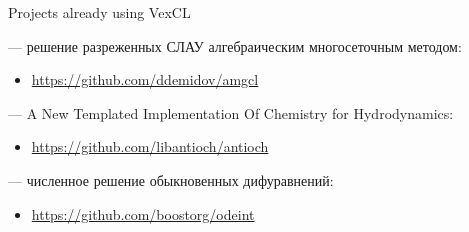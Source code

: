 \documentclass[@BEAMER_OPTIONS@]{beamer}
\begin{document}
\begin{frame}{Projects already using VexCL}
    \begin{description}[\quad]
        \item[AMGCL] --- решение разреженных СЛАУ алгебраическим многосеточным
            методом:
            \begin{itemize}
                \item \href{https://github.com/ddemidov/amgcl}{https://github.com/ddemidov/amgcl}
            \end{itemize}
            \vspace{\baselineskip}
        \item[Antioch] --- A New Templated Implementation Of Chemistry for
            Hydrodynamics:
            \begin{itemize}
                \item \href{https://github.com/libantioch/antioch}{https://github.com/libantioch/antioch}
            \end{itemize}
            \vspace{\baselineskip}
        \item[Boost.odeint] --- численное решение обыкновенных дифуравнений:
            \begin{itemize}
                \item \href{https://github.com/boostorg/odeint}{https://github.com/boostorg/odeint}
            \end{itemize}
    \end{description}
\end{frame}

\note{ }
\end{document}
